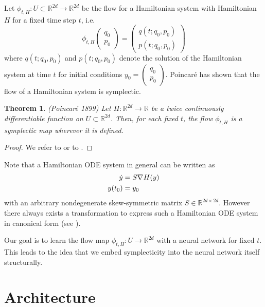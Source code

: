 \documentclass[twoside,a4paper]{article}
\newtheorem{theorem}{Theorem}
\begin{document}
Let $\phi_{t,H} : U \subset \mathbb{R}^{2d} \to \mathbb{R}^{2d}$ be the flow for a Hamiltonian system 
with Hamiltonian $H$ for a fixed time step $t$, i.e.
\begin{equation*}
	\phi_{t,H}\begin{pmatrix}
		q_0 \\
		p_0
	\end{pmatrix}
	= \begin{pmatrix}
		q(t; q_0, p_0) \\
		p(t; q_0, p_0)
	\end{pmatrix}
\end{equation*}
where $q(t; q_0, p_0)$ and $p(t; q_0, p_0)$ denote the solution of the Hamiltonian system
at time $t$ for initial conditions $y_0 = \begin{pmatrix}
	q_0 \\
	p_0
\end{pmatrix}$. Poincaré has shown that the flow of a Hamiltonian system is symplectic.

\begin{theorem}(Poincaré 1899)
	Let $H: \mathbb{R}^{2d} \to \mathbb{R}$ be a twice continuously differentiable
	function on $U \subset \mathbb{R}^{2d}$. Then, for each fixed $t$, the flow
	$\phi_{t,H}$ is a symplectic map wherever it is defined.
\end{theorem}
\begin{proof}
	We refer to \citet[Theorem 2.4, p.~184]{hairer2006} 
	or to \citet[Theorem 1, p.~54]{leimkuhler_reich_2005}.
\end{proof}

Note that a Hamiltonian ODE system in general can be written as
\begin{align*}
	\dot{y} &= S \nabla_{}{H}(y) \\
	y(t_0) &= y_0
\end{align*}
with an arbitrary nondegenerate skew-symmetric matrix $S \in \mathbb{R}^{2d \times 2d}$.
However there always exists a transformation to express such a Hamiltonian ODE system in
canonical form (see \citet[Remark 3.8]{peng2016}). 

Our goal is to learn the flow map $\phi_{t,H} : U \to \mathbb{R}^{2d}$ with a neural network
for fixed $t$.
This leads to the idea that we embed symplecticity into the neural network itself structurally. 

\section{Architecture}
\end{document}
